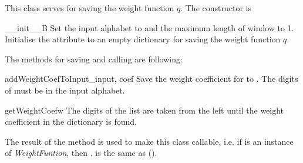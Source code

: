 This class serves for saving the weight function $q$. The constructor is

\begin{method}{\_\_init\_\_}{B}
Set the input alphabet to  and the maximum length of window to 1. Initialise the attribute  to an empty dictionary for saving the weight function $q$. 
\end{method}

The methods for saving and calling are following:

\begin{method}{addWeightCoefToInput}{\_input, coef}
Save the weight coefficient  for  to . The digits of  must be in the input alphabet.
\end{method}

\begin{method}{getWeightCoef}{w}
The digits of the list  are taken from the left until the weight coefficient in the dictionary  is found. 
\end{method}

The result of the method  is used to make this class callable, i.e. if  is an instance of \emph{WeightFuntion}, then . is the same as ().




